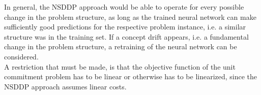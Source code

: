 In general, the NSDDP approach would be able to operate for every possible change in the problem structure, as long as the trained neural network can make sufficiently good predictions for the respective problem instance, i.e. a similar structure was in the training set.
If a concept drift appears, i.e. a fundamental change in the problem structure, a retraining of the neural network can be considered. \\
A restriction that must be made, is that the objective function of the unit commitment problem has to be linear or otherwise has to be linearized, since the NSDDP approach assumes linear costs.
